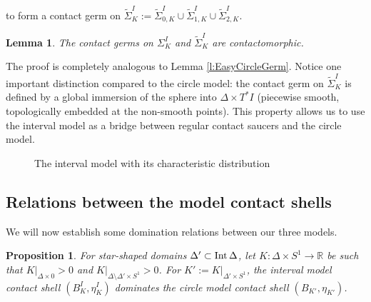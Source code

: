\documentclass[12pt]{paper}
\theoremstyle{plain}
\newtheorem{prop}[theorem]{Proposition}
\newtheorem{lemma}[theorem]{Lemma}
\newtheorem{remark}[theorem]{Remark}
\theoremstyle{definition}
\newcommand{\R}{{\mathbb{R}}}
\newcommand{\Int}{{\rm Int\,}} %
\numberwithin{figure}{section}
\begin{document}
to form a contact germ on $\tilde{\Sigma}_K^{I} := \tilde\Sigma_{0,K}^{I}  \cup \tilde\Sigma_{1,K}^{I} \cup \tilde\Sigma_{2,K}^{I}$.
\begin{lemma}\label{l:EasyIntervalGerm}
	The contact germs on $\Sigma_K^{I}$ and $\tilde{\Sigma}_K^{I}$ are contactomorphic.
\end{lemma}
The proof is completely analogous to Lemma \ref{l:EasyCircleGerm}. Notice one important distinction compared to the circle model: the contact germ on $\tilde{\Sigma}_K^I$ is defined by a global immersion of the sphere into $\Delta \times T^*I$ (piecewise smooth, topologically embedded at the non-smooth points). This property allows us to use the interval model as a bridge between regular contact saucers and the circle model.



\begin{figure}
   \centering
   \def\svgwidth{200pt}
   
   \caption{The interval model with its characteristic distribution}
  \label{f:poly2}
\end{figure} 

\subsection{Relations between the model contact shells}\label{lm:domination}

We will now establish some domination relations between our three models. 
 
\begin{prop}\label{l:equiv12}
	For star-shaped domains $\Delta' \subset \Int \Delta$, let 
	$K : \Delta \times S^1 \to \R$ be such that $K|_{\Delta \times 0} > 0$ and $K|_{\Delta\setminus\Delta' \times S^1} > 0$.
	For $K' := K|_{\Delta' \times S^1}$, the  interval model contact shell  
	$(B_K^I, \eta^I_K)$ dominates  the circle model contact shell $(B_{K'}, \eta_{K'})$.  
\end{prop}

 
\end{document}

